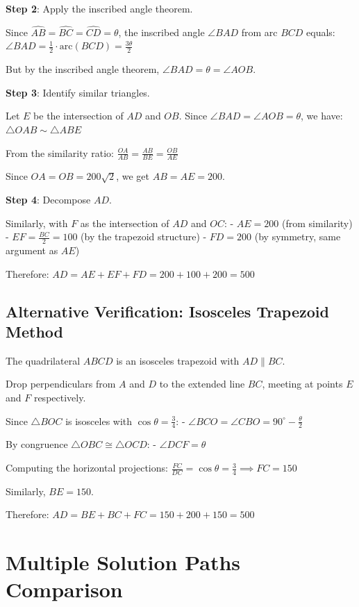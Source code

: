\documentclass[12pt]{article}
\begin{document}
\textbf{Step 2}: Apply the inscribed angle theorem.

Since $\widehat{AB} = \widehat{BC} = \widehat{CD} = \theta$, the inscribed angle $\angle BAD$ from arc $BCD$ equals:
$\angle BAD = \frac{1}{2} \cdot \text{arc}(BCD) = \frac{3\theta}{2}$

But by the inscribed angle theorem, $\angle BAD = \theta = \angle AOB$.

\textbf{Step 3}: Identify similar triangles.

Let $E$ be the intersection of $AD$ and $OB$. Since $\angle BAD = \angle AOB = \theta$, we have:
$\triangle OAB \sim \triangle ABE$

From the similarity ratio:
$\frac{OA}{AB} = \frac{AB}{BE} = \frac{OB}{AE}$

Since $OA = OB = 200\sqrt{2}$, we get $AB = AE = 200$.

\textbf{Step 4}: Decompose $AD$.

Similarly, with $F$ as the intersection of $AD$ and $OC$:
- $AE = 200$ (from similarity)
- $EF = \frac{BC}{2} = 100$ (by the trapezoid structure)
- $FD = 200$ (by symmetry, same argument as $AE$)

Therefore:
$AD = AE + EF + FD = 200 + 100 + 200 = \boxed{500}$

\subsection*{Alternative Verification: Isosceles Trapezoid Method}

The quadrilateral $ABCD$ is an isosceles trapezoid with $AD \parallel BC$.

Drop perpendiculars from $A$ and $D$ to the extended line $BC$, meeting at points $E$ and $F$ respectively.

Since $\triangle BOC$ is isosceles with $\cos\theta = \frac{3}{4}$:
- $\angle BCO = \angle CBO = 90^\circ - \frac{\theta}{2}$

By congruence $\triangle OBC \cong \triangle OCD$:
- $\angle DCF = \theta$

Computing the horizontal projections:
$\frac{FC}{DC} = \cos\theta = \frac{3}{4} \implies FC = 150$

Similarly, $BE = 150$.

Therefore:
$AD = BE + BC + FC = 150 + 200 + 150 = 500$

\section*{Multiple Solution Paths Comparison}
\end{document}
